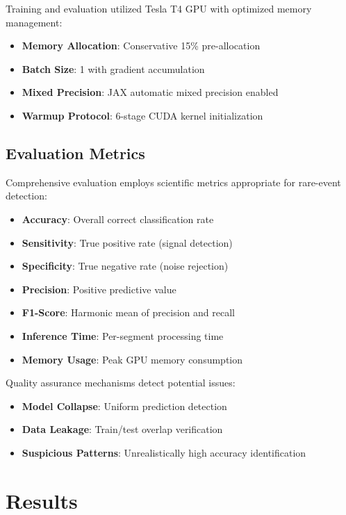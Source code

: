 \documentclass[12pt,a4paper]{article}
\begin{document}
Training and evaluation utilized Tesla T4 GPU with optimized memory management:
\begin{itemize}
\item \textbf{Memory Allocation}: Conservative 15\% pre-allocation
\item \textbf{Batch Size}: 1 with gradient accumulation
\item \textbf{Mixed Precision}: JAX automatic mixed precision enabled
\item \textbf{Warmup Protocol}: 6-stage CUDA kernel initialization
\end{itemize}

\subsection{Evaluation Metrics}

Comprehensive evaluation employs scientific metrics appropriate for rare-event detection:

\begin{itemize}
\item \textbf{Accuracy}: Overall correct classification rate
\item \textbf{Sensitivity}: True positive rate (signal detection)
\item \textbf{Specificity}: True negative rate (noise rejection)
\item \textbf{Precision}: Positive predictive value
\item \textbf{F1-Score}: Harmonic mean of precision and recall
\item \textbf{Inference Time}: Per-segment processing time
\item \textbf{Memory Usage}: Peak GPU memory consumption
\end{itemize}

Quality assurance mechanisms detect potential issues:
\begin{itemize}
\item \textbf{Model Collapse}: Uniform prediction detection
\item \textbf{Data Leakage}: Train/test overlap verification
\item \textbf{Suspicious Patterns}: Unrealistically high accuracy identification
\end{itemize}

\section{Results}
\end{document}
